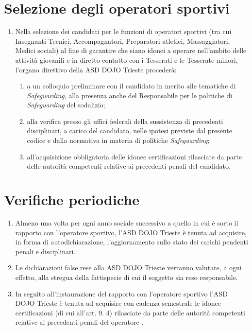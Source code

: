 \documentclass{djtsasddoc}
\begin{document}
	\section{Selezione degli operatori sportivi}
	\begin{enumerate}
		\item Nella selezione dei candidati per le funzioni di operatori sportivi (tra cui Insegnanti Tecnici, Accompagnatori, Preparatori atletici, Massaggiatori, Medici sociali) al fine di garantire che siano idonei a operare nell'ambito delle attività giovanili e in diretto contatto con i Tesserati e le Tesserate minori, l'organo direttivo della ASD DOJO Trieste procederà:
		\begin{enumerate}
			\item a un colloquio preliminare con il candidato in merito alle tematiche di \textit{Safeguarding}, alla	presenza anche del Responsabile per le politiche di \textit{Safeguarding} del sodalizio;
			\item alla verifica presso gli uffici federali della sussistenza di precedenti disciplinari, a carico del candidato, nelle ipotesi previste dal presente codice e dalla normativa in materia di politiche \textit{Safeguarding};
			\item all'acquisizione obbligatoria delle idonee certificazioni rilasciate da parte delle autorità competenti relative ai precedenti penali del candidato.
		\end{enumerate}
	\end{enumerate}
	
	\section{Verifiche periodiche}
	\begin{enumerate}
		\item Almeno una volta per ogni anno sociale successivo a quello in cui è sorto il rapporto con l'operatore sportivo, l'ASD DOJO Trieste è tenuta ad acquisire, in forma di autodichiarazione, l'aggiornamento sullo stato dei carichi pendenti penali e disciplinari.
		\item Le dichiarazioni false rese alla ASD DOJO Trieste verranno valutate, a ogni effetto, alla stregua della fattispecie di cui il soggetto sia reso responsabile.
		\item In seguito all'instaurazione del rapporto con l'operatore sportivo  l'ASD DOJO Trieste è tenuta ad acquisire con cadenza semestrale le idonee certificazioni (di cui all'art. 9. 4) rilasciate da parte delle autorità competenti relative ai precedenti penali del operatore .
	\end{enumerate}
	
\end{document}
